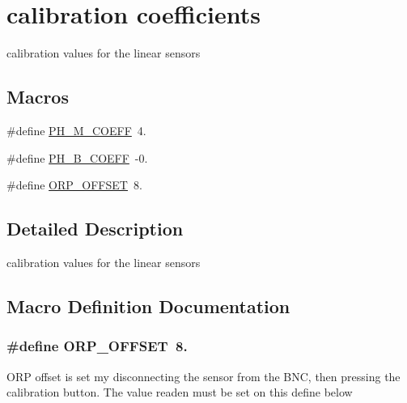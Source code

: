 \hypertarget{group___c_a_l___c_o_e_f_f}{}\section{calibration coefficients}
\label{group___c_a_l___c_o_e_f_f}


calibration values for the linear sensors  


\subsection*{Macros}
\begin{DoxyCompactItemize}
\item 
\#define \hyperlink{group___c_a_l___c_o_e_f_f_gabe5c1bc9018d7fb405b0f69c568d866b}{P\+H\+\_\+\+M\+\_\+\+C\+O\+E\+FF}~4.
\item 
\#define \hyperlink{group___c_a_l___c_o_e_f_f_ga3d9cbf54f9b4b5ac4915d7d176e77bfe}{P\+H\+\_\+\+B\+\_\+\+C\+O\+E\+FF}~-\/0.
\item 
\#define \hyperlink{group___c_a_l___c_o_e_f_f_gafd22da5c5584608227366042cdc86166}{O\+R\+P\+\_\+\+O\+F\+F\+S\+ET}~8.
\end{DoxyCompactItemize}


\subsection{Detailed Description}
calibration values for the linear sensors 



\subsection{Macro Definition Documentation}
\subsubsection[{\texorpdfstring{O\+R\+P\+\_\+\+O\+F\+F\+S\+ET}{ORP_OFFSET}}]{\setlength{\rightskip}{0pt plus 5cm}\#define O\+R\+P\+\_\+\+O\+F\+F\+S\+ET~8.}\hypertarget{group___c_a_l___c_o_e_f_f_gafd22da5c5584608227366042cdc86166}{}\label{group___c_a_l___c_o_e_f_f_gafd22da5c5584608227366042cdc86166}
O\+RP offset is set my disconnecting the sensor from the B\+NC, then pressing the calibration button. The value readen must be set on this define below 
